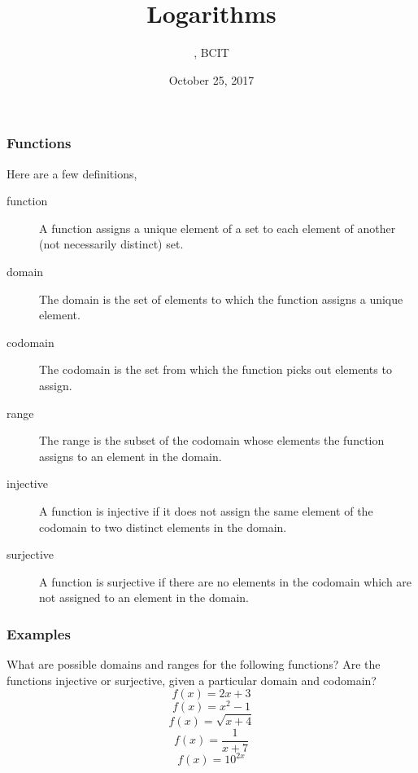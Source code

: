 \documentclass[xcolor=dvipsnames]{beamer}
\title{Logarithms}
\subtitle{{\CourseNumber}, BCIT}
\author{\CourseName}
\date{October 25, 2017}
\begin{document}
\begin{frame}
  \titlepage
\end{frame}

\begin{frame}
  \frametitle{Functions}
Here are a few definitions,
\begin{description}
\item[function] A function assigns a unique element of a set to each
  element of another (not necessarily distinct) set.
\item[domain] The domain is the set of elements to which the function
  assigns a unique element.
\item[codomain] The codomain is the set from which the function picks
  out elements to assign.
\item[range] The range is the subset of the codomain whose elements
  the function assigns to an element in the domain.
\item[injective] A function is injective if it does not assign the
  same element of the codomain to two distinct elements in the domain.
\item[surjective] A function is surjective if there are no elements in
  the codomain which are not assigned to an element in the domain.
\end{description}
\end{frame}

\begin{frame}
  \frametitle{Examples}
What are possible domains and ranges for the following functions? Are
the functions injective or surjective, given a particular domain and
codomain?
\begin{equation}
  \label{eq:rebiejie}
  f(x)=2x+3
\end{equation}
\begin{equation}
  \label{eq:ebaivuim}
  f(x)=x^{2}-1
\end{equation}
\begin{equation}
  \label{eq:ichievae}
  f(x)=\sqrt{x+4}
\end{equation}
\begin{equation}
  \label{eq:ejawache}
  f(x)=\frac{1}{x+7}
\end{equation}
\begin{equation}
  \label{eq:tohjuogi}
  f(x)=10^{2x}
\end{equation}
\end{frame}
\end{document}
